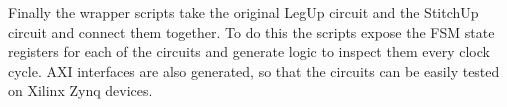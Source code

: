 Finally the wrapper scripts take the original LegUp circuit and the StitchUp circuit and
connect them together.
To do this the scripts expose the FSM state registers for each of the circuits and
generate logic to inspect them every clock cycle.
AXI interfaces are also generated, so that the circuits can be easily tested on Xilinx Zynq devices.
